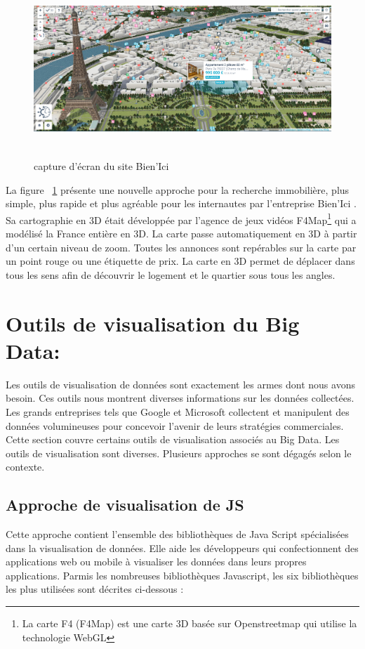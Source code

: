 \documentclass[french, a4paper, 12pt]{report}
\begin{document}
\begin{figure}[!ht]
    \centering
    \includegraphics[height=6.6cm]{images/bienIci.jpg}
    \caption{capture d'écran du site Bien’Ici }
    \label{fig:2.9}
\end{figure}
La figure ~\ref{fig:2.9} présente une nouvelle approche pour la recherche immobilière, plus simple, plus rapide et plus agréable pour les internautes par l’entreprise Bien’Ici . Sa cartographie en 3D était développée par l’agence de jeux vidéos F4Map\footnote{ La carte F4 (F4Map) est une carte 3D basée sur Openstreetmap qui utilise la technologie WebGL } qui a modélisé la France entière en 3D. La carte passe automatiquement en 3D à partir d’un certain niveau de zoom. Toutes les annonces sont repérables sur la carte par un point rouge ou une étiquette de prix.  La carte en 3D permet de déplacer dans tous les sens afin de découvrir le logement et le quartier sous tous les angles.

\section{Outils de visualisation du Big Data: }
Les outils de visualisation de données sont exactement les armes dont nous avons besoin. Ces outils nous montrent diverses informations sur les données collectées. Les grands entreprises tels que Google et Microsoft collectent et manipulent des données volumineuses pour concevoir l'avenir de leurs stratégies commerciales. Cette section couvre certains outils de visualisation associés au Big Data. Les outils de visualisation sont diverses.  Plusieurs approches se sont dégagés selon le contexte. \\

\subsection{Approche de visualisation de JS}
\label{subsec:JS}
Cette approche contient l’ensemble des bibliothèques de Java Script spécialisées dans la visualisation de données. Elle aide les développeurs qui confectionnent des applications web ou mobile à visualiser les données dans leurs propres applications. 
Parmis les nombreuses bibliothèques Javascript, les six bibliothèques les plus utilisées sont décrites ci-dessous : 
\end{document}
